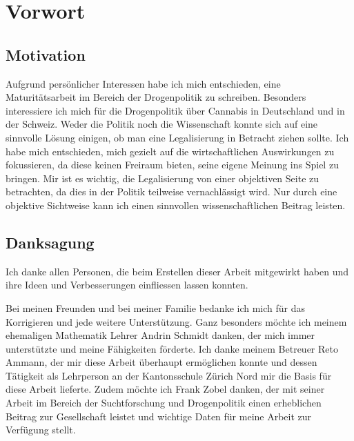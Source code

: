 \documentclass[../main.tex]{subfiles}
\begin{document}
	\section*{Vorwort}	
	
	\subsection*{Motivation}
	Aufgrund persönlicher Interessen habe ich mich entschieden, eine Maturitätsarbeit im Bereich der Drogenpolitik zu schreiben. 
	Besonders interessiere ich mich für die Drogenpolitik über Cannabis in Deutschland und in der Schweiz.
	Weder die Politik noch die Wissenschaft konnte sich auf eine sinnvolle Lösung einigen, ob man eine Legalisierung in Betracht ziehen sollte.
	Ich habe mich entschieden, mich gezielt auf die wirtschaftlichen Auswirkungen zu fokussieren, da diese keinen Freiraum bieten, seine eigene Meinung ins Spiel zu bringen.
	Mir ist es wichtig, die Legalisierung von einer objektiven Seite zu betrachten, da dies in der Politik teilweise vernachlässigt wird.
	Nur durch eine objektive Sichtweise kann ich einen sinnvollen wissenschaftlichen Beitrag leisten.
	
	
	\subsection*{Danksagung}
	Ich danke allen Personen, die beim Erstellen dieser Arbeit mitgewirkt haben und ihre Ideen und Verbesserungen einfliessen lassen konnten.
	
	\noindent
	Bei meinen Freunden und bei meiner Familie bedanke ich mich für das Korrigieren und jede weitere Unterstützung.
	Ganz besonders möchte ich meinem ehemaligen Mathematik Lehrer Andrin Schmidt danken, der mich immer unterstützte und meine Fähigkeiten förderte.
	Ich danke meinem Betreuer Reto Ammann, der mir diese Arbeit überhaupt ermöglichen konnte und dessen Tätigkeit als Lehrperson an der Kantonsschule Zürich Nord mir die Basis für diese Arbeit lieferte.
	Zudem möchte ich Frank Zobel danken, der mit seiner Arbeit im Bereich der Suchtforschung und Drogenpolitik einen erheblichen Beitrag zur Gesellschaft leistet und wichtige Daten für meine Arbeit zur Verfügung stellt. 
	
\end{document}
